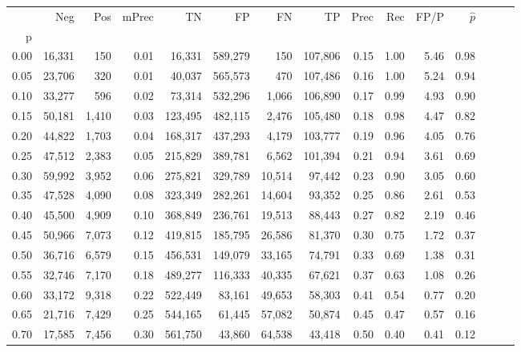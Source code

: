 \begin{tabular}{rrrrrrrrrrrrrrr}
\toprule
{} &     Neg &    Pos & mPrec &       TN &       FP &       FN &       TP &  Prec &   Rec &  FP/P & $\hat{p}$ \\
p    &         &        &       &          &          &          &          &       &       &       &           \\
\midrule
0.00 &  16,331 &    150 &  0.01 &   16,331 &  589,279 &      150 &  107,806 &  0.15 &  1.00 &  5.46 &      0.98 \\
0.05 &  23,706 &    320 &  0.01 &   40,037 &  565,573 &      470 &  107,486 &  0.16 &  1.00 &  5.24 &      0.94 \\
0.10 &  33,277 &    596 &  0.02 &   73,314 &  532,296 &    1,066 &  106,890 &  0.17 &  0.99 &  4.93 &      0.90 \\
0.15 &  50,181 &  1,410 &  0.03 &  123,495 &  482,115 &    2,476 &  105,480 &  0.18 &  0.98 &  4.47 &      0.82 \\
0.20 &  44,822 &  1,703 &  0.04 &  168,317 &  437,293 &    4,179 &  103,777 &  0.19 &  0.96 &  4.05 &      0.76 \\
0.25 &  47,512 &  2,383 &  0.05 &  215,829 &  389,781 &    6,562 &  101,394 &  0.21 &  0.94 &  3.61 &      0.69 \\
0.30 &  59,992 &  3,952 &  0.06 &  275,821 &  329,789 &   10,514 &   97,442 &  0.23 &  0.90 &  3.05 &      0.60 \\
0.35 &  47,528 &  4,090 &  0.08 &  323,349 &  282,261 &   14,604 &   93,352 &  0.25 &  0.86 &  2.61 &      0.53 \\
0.40 &  45,500 &  4,909 &  0.10 &  368,849 &  236,761 &   19,513 &   88,443 &  0.27 &  0.82 &  2.19 &      0.46 \\
0.45 &  50,966 &  7,073 &  0.12 &  419,815 &  185,795 &   26,586 &   81,370 &  0.30 &  0.75 &  1.72 &      0.37 \\
0.50 &  36,716 &  6,579 &  0.15 &  456,531 &  149,079 &   33,165 &   74,791 &  0.33 &  0.69 &  1.38 &      0.31 \\
0.55 &  32,746 &  7,170 &  0.18 &  489,277 &  116,333 &   40,335 &   67,621 &  0.37 &  0.63 &  1.08 &      0.26 \\
0.60 &  33,172 &  9,318 &  0.22 &  522,449 &   83,161 &   49,653 &   58,303 &  0.41 &  0.54 &  0.77 &      0.20 \\
0.65 &  21,716 &  7,429 &  0.25 &  544,165 &   61,445 &   57,082 &   50,874 &  0.45 &  0.47 &  0.57 &      0.16 \\
0.70 &  17,585 &  7,456 &  0.30 &  561,750 &   43,860 &   64,538 &   43,418 &  0.50 &  0.40 &  0.41 &      0.12 \\

\end{tabular}
